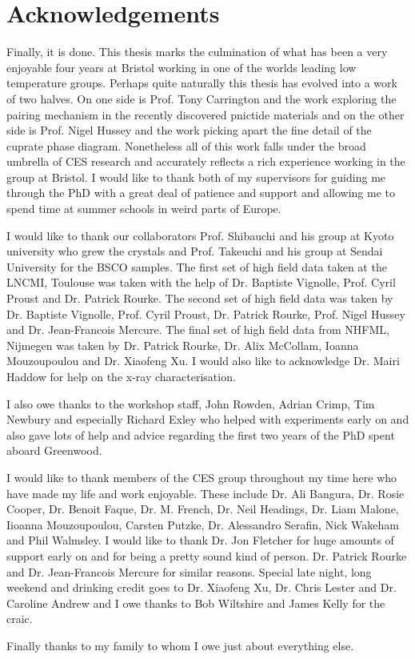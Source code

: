 \cleardoublepage

\section*{Acknowledgements}

Finally, it is done. This thesis marks the culmination of what has been a very enjoyable four years at Bristol working in one of the worlds leading low temperature groups. Perhaps quite naturally this thesis has evolved into a work of two halves. On one side is Prof. Tony Carrington and the work exploring the pairing mechanism in the recently discovered pnictide materials and on the other side is Prof. Nigel Hussey and the work picking apart the fine detail of the cuprate phase diagram. Nonetheless all of this work falls under the broad umbrella of CES research and accurately reflects a rich experience working in the group at Bristol. I would like to thank both of my supervisors for guiding me through the PhD with a great deal of patience and support and allowing me to spend time at summer schools in weird parts of Europe.

I would like to thank our collaborators Prof. Shibauchi and his group at Kyoto university who grew the \BaFePAs crystals and Prof. Takeuchi and his group at Sendai University for the \acs{BSCO} samples. The first set of high field data taken at the \ac{LNCMI}, Toulouse was taken with the help of Dr. Baptiste Vignolle, Prof. Cyril Proust and Dr. Patrick Rourke. The second set of high field data was taken by Dr. Baptiste Vignolle, Prof. Cyril Proust, Dr. Patrick Rourke, Prof. Nigel Hussey and Dr. Jean-Francois Mercure. The final set of high field data from \ac{NHFML}, Nijmegen was taken by Dr. Patrick Rourke, Dr. Alix McCollam, Ioanna Mouzoupoulou and Dr. Xiaofeng Xu. I would also like to acknowledge Dr. Mairi Haddow for help on the x-ray characterisation.

I also owe thanks to the workshop staff, John Rowden, Adrian Crimp, Tim Newbury and especially Richard Exley who helped with experiments early on and also gave lots of help and advice regarding the first two years of the PhD spent aboard Greenwood.

I would like to thank members of the CES group throughout my time here who have made my life and work enjoyable. These include Dr. Ali Bangura, Dr. Rosie Cooper, Dr. Benoit Faque, Dr. M. French, Dr. Neil Headings, Dr. Liam Malone, Iioanna Mouzoupoulou, Carsten Putzke, Dr. Alessandro Serafin, Nick Wakeham and Phil Walmsley. I would like to thank Dr. Jon Fletcher for huge amounts of support early on and for being a pretty sound kind of person. Dr. Patrick Rourke and Dr. Jean-Francois Mercure for similar reasons. Special late night, long weekend and drinking credit goes to Dr. Xiaofeng Xu, Dr. Chris Lester and Dr. Caroline Andrew and I owe thanks to Bob Wiltshire and James Kelly for the craic.

Finally thanks to my family to whom I owe just about everything else.





